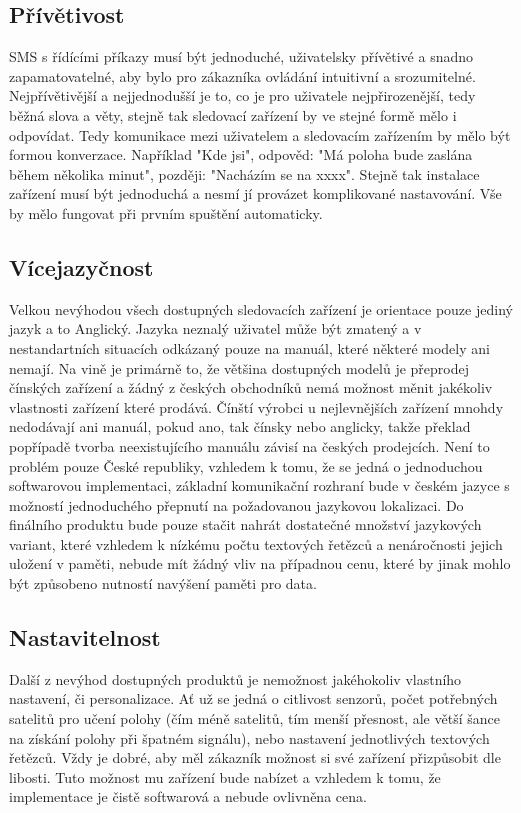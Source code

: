 \documentclass[FM,BP]{tulthesis}
\begin{document}
\subsection{Přívětivost}
SMS s řídícími příkazy musí být jednoduché, uživatelsky přívětivé a snadno zapamatovatelné, aby bylo pro zákazníka ovládání intuitivní a srozumitelné. Nejpřívětivější a nejjednodušší je to, co je pro uživatele nejpřirozenější, tedy běžná slova a věty, stejně tak sledovací zařízení by ve stejné formě mělo i odpovídat. Tedy komunikace mezi uživatelem a sledovacím zařízením by mělo být formou konverzace. Například "Kde jsi", odpověd: "Má poloha bude zaslána během několika minut", později: "Nacházím se na xxxx". Stejně tak instalace zařízení musí být jednoduchá a nesmí jí provázet komplikované nastavování. Vše by mělo fungovat při prvním spuštění automaticky.

\subsection{Vícejazyčnost}
Velkou nevýhodou všech dostupných sledovacích zařízení je orientace pouze jediný jazyk a to Anglický. Jazyka neznalý uživatel může být zmatený a v nestandartních situacích odkázaný pouze na manuál, které některé modely ani nemají. Na vině je primárně to, že většina dostupných modelů je přeprodej čínských zařízení a žádný z českých obchodníků nemá možnost měnit jakékoliv vlastnosti zařízení které prodává. Čínští výrobci u nejlevnějších zařízení mnohdy nedodávají ani manuál, pokud ano, tak čínsky nebo anglicky, takže překlad popřípadě tvorba neexistujícího manuálu závisí na českých prodejcích. Není to problém pouze České republiky, vzhledem k tomu, že se jedná o jednoduchou softwarovou implementaci, základní komunikační rozhraní bude v českém jazyce s možností jednoduchého přepnutí na požadovanou jazykovou lokalizaci. Do finálního produktu bude pouze stačit nahrát dostatečné množství jazykových variant, které vzhledem k nízkému počtu textových řetězců a nenáročnosti jejich uložení v paměti, nebude mít žádný vliv na případnou cenu, které by jinak mohlo být způsobeno nutností navýšení paměti pro data.

\subsection{Nastavitelnost}
Další z nevýhod dostupných produktů je nemožnost jakéhokoliv vlastního nastavení, či personalizace. Ať už se jedná o citlivost senzorů, počet potřebných satelitů pro učení polohy (čím méně satelitů, tím menší přesnost, ale větší šance na získání polohy při špatném signálu), nebo nastavení jednotlivých textových řetězců. Vždy je dobré, aby měl zákazník možnost si své zařízení přizpůsobit dle libosti. Tuto možnost mu zařízení bude nabízet a vzhledem k tomu, že implementace je čistě softwarová a nebude ovlivněna cena.
\end{document}
